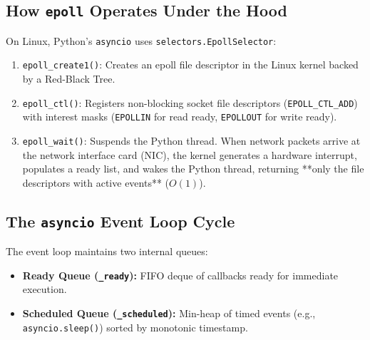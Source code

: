 \subsection{How \texttt{epoll} Operates Under the Hood}

On Linux, Python's \texttt{asyncio} uses \texttt{selectors.EpollSelector}:
\begin{enumerate}[leftmargin=15pt]
  \item \texttt{epoll\_create1()}: Creates an epoll file descriptor in the Linux kernel backed by a Red-Black Tree.
  \item \texttt{epoll\_ctl()}: Registers non-blocking socket file descriptors (\texttt{EPOLL\_CTL\_ADD}) with interest masks (\texttt{EPOLLIN} for read ready, \texttt{EPOLLOUT} for write ready).
  \item \texttt{epoll\_wait()}: Suspends the Python thread. When network packets arrive at the network interface card (NIC), the kernel generates a hardware interrupt, populates a ready list, and wakes the Python thread, returning **only the file descriptors with active events** ($O(1)$).
\end{enumerate}

\subsection{The \texttt{asyncio} Event Loop Cycle}

The event loop maintains two internal queues:
\begin{itemize}[leftmargin=15pt]
  \item \textbf{Ready Queue (\texttt{\_ready}):} FIFO deque of callbacks ready for immediate execution.
  \item \textbf{Scheduled Queue (\texttt{\_scheduled}):} Min-heap of timed events (e.g., \texttt{asyncio.sleep()}) sorted by monotonic timestamp.
\end{itemize}

